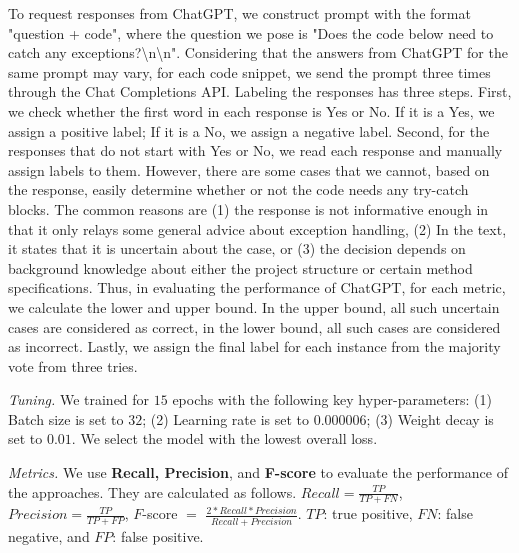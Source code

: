 To request responses from ChatGPT, we construct prompt with the format
"question + code", where the question we pose is "Does the code below
need to catch any exceptions?\textbackslash n\textbackslash n".
Considering that the answers from ChatGPT for the same prompt may
vary, for each code snippet, we send the prompt three times through
the Chat Completions API.
Labeling the responses has three steps. First, we check whether the
first word in each response is Yes or No. If it is a Yes, we assign a
positive label; If it is a No, we assign a negative label. Second, for
the responses that do not start with Yes or No, we read each response
and manually assign labels to them.  However, there are some cases
that we cannot, based on the response, easily determine whether or not
the code needs any try-catch blocks. The common reasons are (1) the
response is not informative enough in that it only relays some general
advice about exception handling, (2) In the text, it states that it is
uncertain about the case, or (3) the decision depends on background
knowledge about either the project structure or certain method
specifications. Thus, in evaluating the performance of ChatGPT,
for each metric, we calculate the lower and upper bound. In the upper
bound, all such uncertain cases are considered as correct,
in the lower bound, all such cases are considered as incorrect.
Lastly, we assign the final label for each instance from the majority
vote from three tries.



{\em Tuning.} We trained {\tool} for $15$ epochs with the following key hyper-parameters: (1) Batch size is set to $32$; (2) Learning rate is set to $0.000006$; (3) Weight decay is set to $0.01$. We select the model with the lowest overall loss.


{\em Metrics.} We use \textbf{Recall, Precision}, and {\bf F-score} to
evaluate the performance of the approaches. They are calculated as follows.
$Recall = \frac{TP}{TP+FN}$, $Precision = \frac{TP}{TP+FP}$, $F$-score
$=$ $\frac{2*Recall*Precision}{Recall+Precision}$. $TP$: true
positive, $FN$: false negative, and $FP$: false positive.
